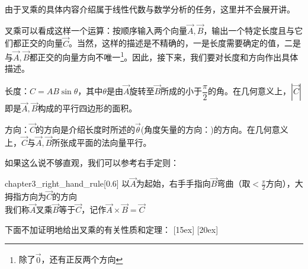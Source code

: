 由于叉乘的具体内容介绍属于线性代数与数学分析的任务，这里并不会展开讲。

叉乘可以看成这样一个运算：按顺序输入两个向量$\vec{A},\vec{B}$，输出一个特定长度且与它们都正交的向量$\vec{C}$。当然，这样的描述是不精确的，一是长度需要确定的值，二是与$\vec{A},\vec{B}$都正交的向量方向不唯一\footnote{除了$\vec{0}$，还有正反两个方向}。因此，接下来，我们要对长度和方向作出具体描述。

\begin{Itemize}
	\item 长度：$C=AB\sin\theta$，其中$\theta$是由$\vec{A}$旋转至$\vec{B}$所成的小于$\dfrac{\pi}{2}$的角\footnotemark 。在几何意义上，$|\vec{C}|$即是$\vec{A},\vec{B}$构成的平行四边形的面积。
	\item 方向：$\vec{C}$的方向是介绍长度时所述的$\vec{\theta}$(角度矢量的方向：)的方向。在几何意义上，$\vec{C}$与$\vec{A},\vec{B}$所张成平面的法向量平行。
\end{Itemize}

如果这么说不够直观，我们可以参考右手定则：

\begin{singlefigure}{chapter3_right_hand_rule}[0.6]
	以$\vec{A}$为起始，右手手指向$\vec{B}$弯曲（取$<\frac{\pi}{2}$方向），大拇指方向为$\vec{C}$的方向\\
	我们称$\vec{A}$叉乘$\vec{B}$等于$\vec{C}$，记作$\vec{A}\times\vec{B}=\vec{C}$
\end{singlefigure}

下面不加证明地给出叉乘的有关性质和定理：
[15ex]
[20ex]


